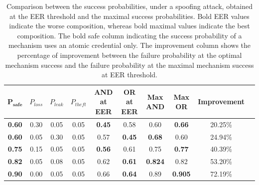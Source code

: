 \documentclass[conference,compsoc]{IEEEtran}
\begin{document}
\begin{table}[t]
\centering
\caption{Comparison between the success probabilities, under a spoofing attack, obtained at the EER threshold and the maximal success probabilities. Bold EER values indicate the worse composition, whereas bold maximal values indicate the best composition. The bold safe column indicating the success probability of a mechanism uses an atomic credential only. The improvement column shows the percentage of improvement between the failure probability at the optimal mechanism success and the failure probability at the maximal mechanism success at EER threshold.}
\label{tab:psafe_sweep_improvement}
\begin{tabular}{cccccccccc}
\toprule
$\mathbf{P_{safe}}$ & $P_{loss}$ & $P_{leak}$ & $P_{theft}$ & AND at EER & OR at EER & Max AND & Max OR & Improvement \\
\midrule
\textbf{0.60} & 0.30 & 0.05 & 0.05 & \textbf{0.45} & 0.58 & 0.60 & \textbf{0.66} & 20.25\% \\
\textbf{0.60} & 0.05 & 0.30 & 0.05 & 0.57 & \textbf{0.45} & \textbf{0.68} & 0.60 & 24.94\% \\
\textbf{0.75} & 0.15 & 0.05 & 0.05 & \textbf{0.56} & 0.61 & 0.75 & \textbf{0.77} & 40.39\% \\
\textbf{0.82} & 0.05 & 0.08 & 0.05 & 0.62 & \textbf{0.61} & \textbf{0.824} & 0.82 & 53.20\% \\
\textbf{0.90} & 0.00 & 0.05 & 0.05 & 0.66 & \textbf{0.64} & 0.89 & \textbf{0.905} & 72.19\% \\
\bottomrule
\end{tabular}
\end{table}
\end{document}
